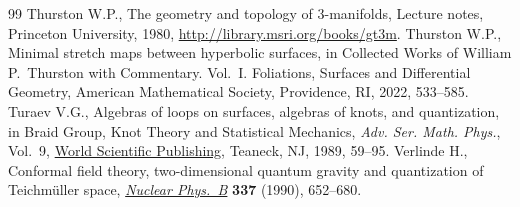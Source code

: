 \documentclass[pdftex]{sigma}
\numberwithin{equation}{section}
\theoremstyle{definition}
\begin{document}
\begin{thebibliography}{99}
Thurston W.P., The geometry and topology of $3$-manifolds, {L}ecture notes,
 Princeton University, 1980, \url{http://library.msri.org/books/gt3m}.
Thurston W.P., Minimal stretch maps between hyperbolic surfaces, in Collected
 Works of {W}illiam {P}.~{T}hurston with Commentary. {V}ol.~{I}. {F}oliations,
 Surfaces and Differential Geometry, American Mathematical Society,
 Providence, RI, 2022, 533--585.
Turaev V.G., Algebras of loops on surfaces, algebras of knots, and
 quantization, in Braid Group, Knot Theory and Statistical Mechanics,
 \textit{Adv. Ser. Math. Phys.}, Vol.~9,
 \href{https://doi.org/10.1142/9789812798350_0003}{World Scientific
 Publishing}, Teaneck, NJ, 1989, 59--95.
Verlinde H., Conformal field theory, two-dimensional quantum gravity and
 quantization of {T}eichm\"{u}ller space,
 \href{https://doi.org/10.1016/0550-3213(90)90510-K}{\textit{Nuclear Phys.~B}}
 \textbf{337} (1990), 652--680.
\end{thebibliography}\LastPageEnding
\end{document}
